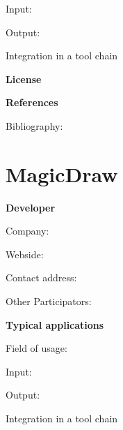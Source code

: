 \documentclass{./template/openetcs2}
\begin{document}
	Input:

	Output:





	Integration in a tool chain



	\textbf{License}


	\textbf{References}

	Bibliography:


\section{MagicDraw}

	\textbf{Developer}

	Company: 

	Webside:

	Contact address:

	Other  Participators:



	\textbf{Typical applications}

	Field of usage:


	Input:

	Output:





	Integration in a tool chain

\end{document}

